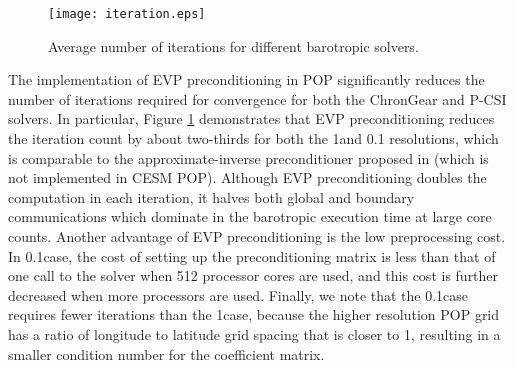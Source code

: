 \begin {figure}[!t]
\centering
\texttt{[image: iteration.eps]}
\vspace{-.1in}
\caption[] {Average number of iterations for different barotropic solvers. \label{fig:iteration}}
\vspace{-.1in}
\end{figure}

The implementation of EVP preconditioning in POP significantly reduces
the number of iterations required for convergence for both the ChronGear and P-CSI solvers.
In particular,  Figure \ref{fig:iteration} demonstrates that EVP
preconditioning reduces the iteration count by about two-thirds for
both the 1\degree\space and 0.1 \degree\space resolutions, which is comparable to the
approximate-inverse preconditioner proposed in
\cite{smith1992parallel} (which is not implemented in CESM POP).
Although  EVP preconditioning doubles the computation in each iteration, it halves both global and boundary communications
which dominate in the barotropic execution time at large core counts.
Another advantage of EVP preconditioning is the low
preprocessing cost.
In 0.1\degree\space case, the cost of setting up the preconditioning matrix
is less than that of one call to the solver when 512 processor cores
are used, and this cost is further decreased when more processors are used.
Finally, we note that the 0.1\degree\space case requires fewer iterations than the
1\degree\space case, because the higher resolution POP grid has a 
ratio of longitude to latitude grid spacing that is closer to 1, resulting
in a smaller condition number for the coefficient matrix.
